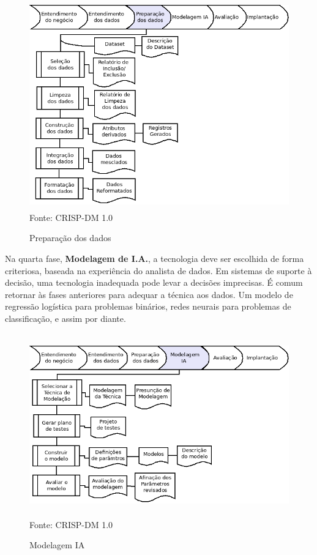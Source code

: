 \begin{figure}[!ht]
\centering
\caption{Preparação dos dados}
\vspace{1mm}
\includegraphics[width=120mm, height=90mm]{Figuras/Cronograma/PreparaDados.png}\\
\tiny Fonte: CRISP-DM 1.0
\end{figure}

\vspace{0.9cm}

Na quarta fase, \textbf{Modelagem de I.A.}, a tecnologia deve ser escolhida de forma criteriosa, baseada na experiência do analista de dados. 
Em sistemas de suporte à decisão, uma tecnologia inadequada pode levar a decisões imprecisas. É comum retornar às fases anteriores para adequar a técnica aos dados. 
Um modelo de regressão logística para problemas binários, redes neurais para problemas de classificação, e assim por diante.

\begin{figure}[!ht]
\centering
\caption{Modelagem IA}
\vspace{1mm}
\includegraphics[width=120mm, height=79mm]{Figuras/Cronograma/Model_IA.png}\\
\tiny Fonte: CRISP-DM 1.0
\end{figure}

